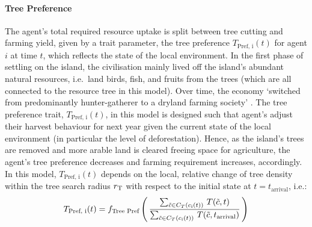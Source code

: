\paragraph{Tree Preference}
The agent's total required resource uptake is split between tree cutting and farming yield, given by a trait parameter, the tree preference $T_\text{Pref, i}(t)$ for agent $i$ at time $t$, which reflects the state of the local environment.
In the first phase of settling on the island, the civilisation mainly lived off the island's abundant natural resources, i.e.\ land birds, fish, and fruits from the trees \citet{Bahn2017} (which are all connected to the resource tree in this model). 
Over time, the economy `switched from predominantly hunter-gatherer to a dryland farming society' \citep{Louwagie2006}.
The tree preference trait, $T_\text{Pref, i}(t)$, in this model is designed such that agent's adjust their harvest behaviour for next year given the current state of the local environment (in particular the level of deforestation).
Hence, as the island's trees are removed and more arable land is cleared freeing space for agriculture, the agent's tree preference decreases and farming requirement increases, accordingly.
In this model, $T_\text{Pref, i}(t)$ depends on the local, relative change of tree density within the tree search radius $r_{\rm T}$ with respect to the initial state at $t=t_\text{arrival}$, i.e.:
\begin{equation}\label{eq:TPref}
T_\text{Pref, i}(t) = f_\text{Tree Pref}\left( \, \frac{\sum_{\tilde{c} \in C_{T}(c_{\rm i}(t)) } \, T(\tilde{c}, t)}{\sum_{\tilde{c} \in C_{T}(c_{\rm i}(t))} \, T(\tilde{c}, t_\text{arrival}) } \, \right)
\end{equation}
